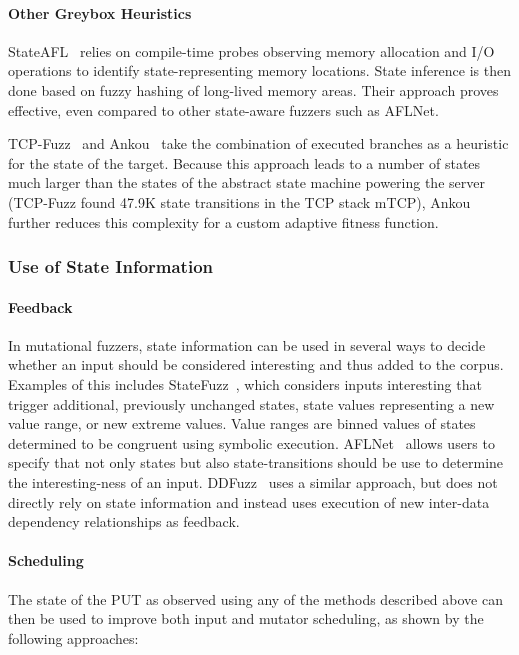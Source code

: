 \documentclass[twocolumn]{article}
\let\savedCite=\cite
\renewcommand{\cite}{\unskip~\savedCite}
\begin{document}
\paragraph{Other Greybox Heuristics}

StateAFL\cite{StateAFL} relies on compile-time probes observing memory allocation and I/O operations to identify state-representing memory locations. State inference is then done based on fuzzy hashing of long-lived memory areas. Their approach proves effective, even compared to other state-aware fuzzers such as AFLNet.

TCP-Fuzz\cite{TCPFuzz} and Ankou\cite{Ankou} take the combination of executed branches as a heuristic for the state of the target. Because this approach leads to a number of states much larger than the states of the abstract state machine powering the server (TCP-Fuzz found 47.9K state transitions in the TCP stack mTCP), Ankou further reduces this complexity for a custom adaptive fitness function.

\subsubsection{Use of State Information}
\paragraph{Feedback}

In mutational fuzzers, state information can be used in several ways to decide whether an input should be considered interesting and thus added to the corpus. Examples of this includes StateFuzz\cite{StateFuzz}, which considers inputs interesting that trigger additional, previously unchanged states, state values representing a new value range, or new extreme values. Value ranges are binned values of states determined to be congruent using symbolic execution. AFLNet\cite{AFLNET} allows users to specify that not only states but also state-transitions should be use to determine the interesting-ness of an input. DDFuzz\cite{DDFuzz} uses a similar approach, but does not directly rely on state information and instead uses execution of new inter-data dependency relationships as feedback.

\paragraph{Scheduling}

The state of the PUT as observed using any of the methods described above can then be used to improve both input and mutator scheduling, as shown by the following approaches:
\end{document}
